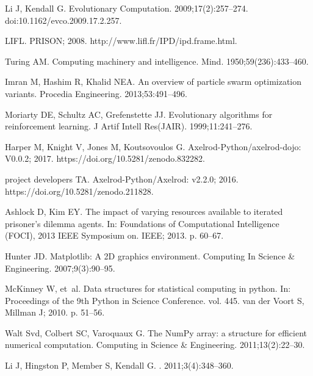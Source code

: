\documentclass[10pt,letterpaper]{article}
\begin{document}
\begin{thebibliography}{10}
Li J, Kendall G.
\newblock Evolutionary Computation. 2009;17(2):257--274.
\newblock doi:{10.1162/evco.2009.17.2.257}.

LIFL. PRISON; 2008.
\newblock http://www.lifl.fr/IPD/ipd.frame.html.

Turing AM.
\newblock Computing machinery and intelligence.
\newblock Mind. 1950;59(236):433--460.

Imran M, Hashim R, Khalid NEA.
\newblock An overview of particle swarm optimization variants.
\newblock Procedia Engineering. 2013;53:491--496.

Moriarty DE, Schultz AC, Grefenstette JJ.
\newblock Evolutionary algorithms for reinforcement learning.
\newblock J Artif Intell Res(JAIR). 1999;11:241--276.

Harper M, Knight V, Jones M, Koutsovoulos G. Axelrod-Python/axelrod-dojo:
  V0.0.2; 2017.
\newblock https://doi.org/10.5281/zenodo.832282.

project developers TA. Axelrod-Python/Axelrod: v2.2.0; 2016.
\newblock https://doi.org/10.5281/zenodo.211828.

Ashlock D, Kim EY.
\newblock The impact of varying resources available to iterated prisoner's
  dilemma agents.
\newblock In: Foundations of Computational Intelligence (FOCI), 2013 IEEE
  Symposium on. IEEE; 2013. p. 60--67.

Hunter JD.
\newblock Matplotlib: A 2D graphics environment.
\newblock Computing In Science \& Engineering. 2007;9(3):90--95.

McKinney W, et~al.
\newblock Data structures for statistical computing in python.
\newblock In: Proceedings of the 9th Python in Science Conference. vol. 445.
  van der Voort S, Millman J; 2010. p. 51--56.

Walt Svd, Colbert SC, Varoquaux G.
\newblock The NumPy array: a structure for efficient numerical computation.
\newblock Computing in Science \& Engineering. 2011;13(2):22--30.

Li J, Hingston P, Member S, Kendall G.
. 2011;3(4):348--360.


\end{thebibliography}
\end{document}
